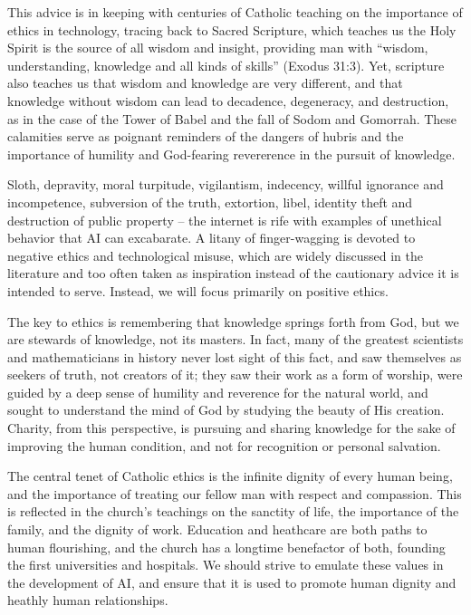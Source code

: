 \documentclass[sigplan,nonacm]{acmart}\settopmatter{printfolios=false,printccs=false,printacmref=false}
\begin{document}
  This advice is in keeping with centuries of Catholic teaching on the importance of ethics in technology, tracing back to Sacred Scripture, which teaches us the Holy Spirit is the source of all wisdom and insight, providing man with ``wisdom, understanding, knowledge and all kinds of skills'' (Exodus 31:3). Yet, scripture also teaches us that wisdom and knowledge are very different, and that knowledge without wisdom can lead to decadence, degeneracy, and destruction, as in the case of the Tower of Babel and the fall of Sodom and Gomorrah. These calamities serve as poignant reminders of the dangers of hubris and the importance of humility and God-fearing revererence in the pursuit of knowledge.

  Sloth, depravity, moral turpitude, vigilantism, indecency, willful ignorance and incompetence, subversion of the truth, extortion, libel, identity theft and destruction of public property -- the internet is rife with examples of unethical behavior that AI can excabarate. A litany of finger-wagging is devoted to negative ethics and technological misuse, which are widely discussed in the literature and too often taken as inspiration instead of the cautionary advice it is intended to serve. Instead, we will focus primarily on positive ethics.

  The key to ethics is remembering that knowledge springs forth from God, but we are stewards of knowledge, not its masters. In fact, many of the greatest scientists and mathematicians in history never lost sight of this fact, and saw themselves as seekers of truth, not creators of it; they saw their work as a form of worship, were guided by a deep sense of humility and reverence for the natural world, and sought to understand the mind of God by studying the beauty of His creation. Charity, from this perspective, is pursuing and sharing knowledge for the sake of improving the human condition, and not for recognition or personal salvation.

  The central tenet of Catholic ethics is the infinite dignity of every human being, and the importance of treating our fellow man with respect and compassion. This is reflected in the church's teachings on the sanctity of life, the importance of the family, and the dignity of work. Education and heathcare are both paths to human flourishing, and the church has a longtime benefactor of both, founding the first universities and hospitals. We should strive to emulate these values in the development of AI, and ensure that it is used to promote human dignity and heathly human relationships.
\end{document}
